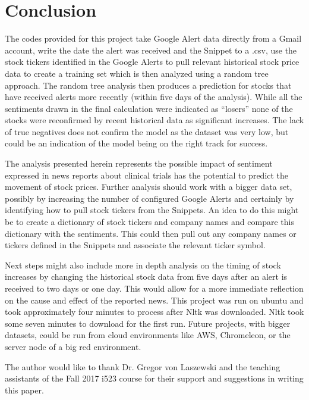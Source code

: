 \documentclass[sigconf]{acmart}
\begin{document}
\section{Conclusion}
The codes provided for this project take Google Alert data directly from a Gmail account, write the date the alert was received and the Snippet to a .csv, use the stock tickers identified in the Google Alerts to pull relevant historical stock price data to create a training set which is then analyzed using a random tree approach. The random tree analysis then produces a prediction for stocks that have received alerts more recently (within five days of the analysis). While all the sentiments drawn in the final calculation were indicated as ``losers'' none of the stocks were reconfirmed by recent historical data as significant increases. The lack of true negatives does not confirm the model as the dataset was very low, but could be an indication of the model being on the right track for success.

The analysis presented herein represents the possible impact of sentiment expressed in news reports about clinical trials has the potential to predict the movement of stock prices. Further analysis should work with a bigger data set, possibly by increasing the number of configured Google Alerts and certainly by identifying how to pull stock tickers from the Snippets. An idea to do this might be to create a dictionary of stock tickers and company names and compare this dictionary with the sentiments. This could then pull out any company names or tickers defined in the Snippets and associate the relevant ticker symbol. 

Next steps might also include more in depth analysis on the timing of stock increases by changing the historical stock data from five days after an alert is received to two days or one day. This would allow for a more immediate reflection on the cause and effect of the reported news. This project was run on ubuntu and took approximately four minutes to process after Nltk was downloaded. Nltk took some seven minutes to download for the first run. Future projects, with bigger datasets, could be run from cloud environments like AWS, Chromeleon, or the server node of a big red environment. 


\begin{acks}

The author would like to thank Dr. Gregor von Laszewski and the teaching assistants of the Fall 2017 i523 course for their support and suggestions in writing this paper. 

\end{acks}


 
\end{document}
